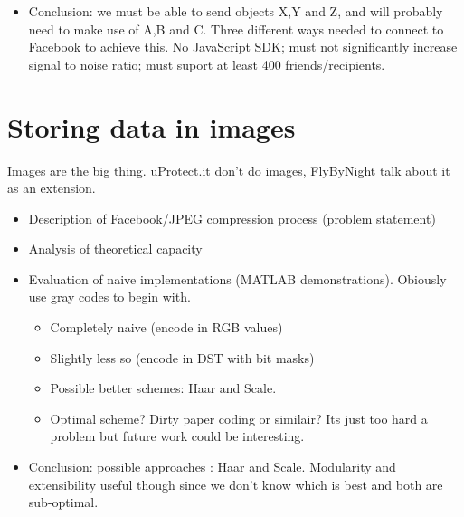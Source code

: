 \begin{itemize}
    \item Conclusion: we must be able to send objects X,Y and Z, and will probably need to make use of A,B and C. Three different ways needed to connect to Facebook to achieve this. No JavaScript SDK; must not significantly increase signal to noise ratio; must suport at least 400 friends/recipients.

\end{itemize}
    
\section{Storing data in images}
    Images are the big thing. uProtect.it don't do images, FlyByNight talk about it as an extension.
    \begin{itemize}
	\item Description of Facebook/JPEG compression process (problem statement)
	\item Analysis of theoretical capacity
	\item Evaluation of naive implementations (MATLAB demonstrations). Obiously use gray codes to begin with.
            \begin{itemize}
		\item Completely naive (encode in RGB values)
		\item Slightly less so (encode in DST with bit masks)
                \item Possible better schemes: Haar and Scale.
                \item Optimal scheme? Dirty paper coding or similair? Its just too hard a problem but future work could be interesting.
             \end{itemize}
	\item Conclusion: possible approaches : Haar and Scale. Modularity and extensibility useful though since we don't know which is best and both are sub-optimal.
    \end{itemize}
    
